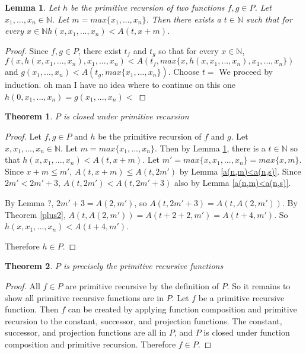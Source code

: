 \documentclass[12pt, letterpaper]{article}
\newtheorem{theorem}{Theorem}
\newtheorem{lemma}{Lemma}
\theoremstyle{case}
\begin{document}
    \begin{lemma}
      \label{recursionlemma}
      Let $h$ be the primitive recursion of two functions $f, g \in P$.
      Let $x_1, ..., x_n \in \mathbb{N}$.
      Let $m = max\{x_1, ..., x_n\}$.
      Then there exists a $t \in \mathbb{N}$ such that for every $x \in \mathbb{N}
      h(x, x_1, ..., x_n) < A(t, x + m)$.
    \end{lemma}
    \begin{proof}
      Since $f, g \in P$, there exist $t_f$ and $t_g$ so that for every $x \in \mathbb{N}$, 
      $f(x, h(x, x_1, ..., x_n), x_1, ..., x_n) < A(t_f, max\{x, h(x, x_1, ..., x_n), x_1, ..., x_n\})$ and
      $g(x_1, ..., x_n) < A(t_g, max\{x_1, ..., x_n\})$.
      Choose $t = $
      We proceed by induction.
      oh man I have no idea where to continue on this one
      $h(0, x_1, ..., x_n) = g(x_1, ..., x_n) < $
    \end{proof}

    \begin{theorem}
      $P$ is closed under primitive recursion
    \end{theorem}
    \begin{proof}
      Let $f, g \in P$ and $h$ be the primitive recursion of $f$ and $g$.
      Let $x, x_1, ..., x_n \in \mathbb{N}$.
      Let $m = max\{x_1, ..., x_n\}$.
      Then by Lemma \ref{recursionlemma}, there is a $t \in \mathbb{N}$ so that
      $h(x, x_1, ..., x_n) < A(t, x + m)$.
      Let $m' = max\{x, x_1, ..., x_n\} = max\{x, m\}$.
      Since $x + m \leq m'$, $A(t, x + m) \leq A(t, 2m')$ by Lemma \ref{a(n,m)<a(n,s)}.
      Since $2m' < 2m' + 3$, $A(t, 2m') < A(t, 2m' + 3)$ also by Lemma \ref{a(n,m)<a(n,s)}.

      By Lemma ?, $2m' + 3 = A(2, m')$, so $A(t, 2m' + 3) = A(t, A(2, m'))$.
      By Theorem \ref{plus2}, $A(t, A(2, m')) = A(t + 2 + 2, m') = A(t + 4, m')$.
      So $h(x, x_1, ..., x_n) < A(t + 4, m')$.

      Therefore $h \in P$.
    \end{proof}

    \begin{theorem}
      $P$ is precisely the primitive recursive functions
    \end{theorem}
    \begin{proof}
      All $f \in P$ are primitive recursive by the definition of $P$.
      So it remains to show all primitive recursive functions are in $P$.
      Let $f$ be a primitive recursive function.
      Then $f$ can be created by applying function composition and primitive recursion to the constant, successor, and
      projection functions. The constant, successor, and projection functions are all in $P$, and $P$ is closed under
      function composition and primitive recursion. Therefore $f \in P$.
    \end{proof}
\end{document}
